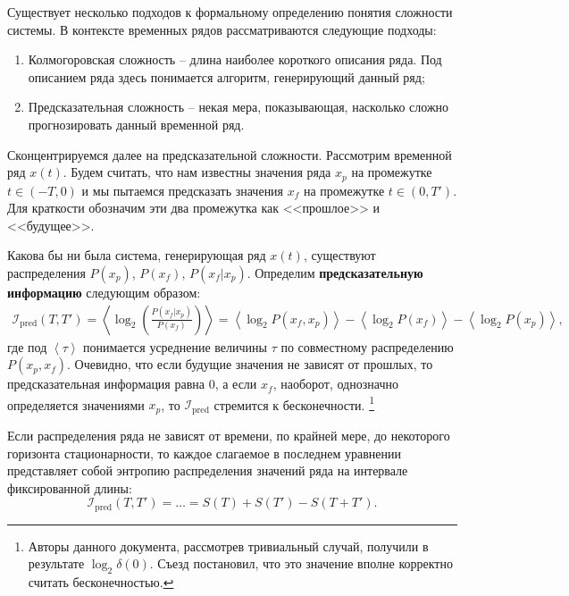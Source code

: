 
Существует несколько подходов к формальному определению понятия сложности системы.
В контексте временных рядов рассматриваются следующие подходы:
\begin{enumerate}
\item
    Колмогоровская сложность -- длина наиболее короткого описания ряда. Под описанием ряда здесь понимается алгоритм, генерирующий данный ряд;
\item
    Предсказательная сложность -- некая мера, показывающая, насколько сложно прогнозировать данный временной ряд.
\end{enumerate}

Сконцентрируемся далее на предсказательной сложности.
Рассмотрим временной ряд $x(t)$.
Будем считать, что нам известны значения ряда $x_p$ на промежутке $t \in \left( -T, 0 \right)$ и мы пытаемся предсказать значения $x_f$ на промежутке $t \in \left( 0, T' \right)$.
Для краткости обозначим эти два промежутка как <<прошлое>> и <<будущее>>.

Какова бы ни была система, генерирующая ряд $x(t)$, существуют распределения $P(x_p)$, $P(x_f)$, $P(x_f | x_p)$.
Определим \textbf{предсказательную информацию} следующим образом:
\begin{gather*}
    \mathcal{I}_{\text{pred}}\left( T, T' \right) =
    \left\langle \log_2 \left( \frac{P(x_f | x_p)}{P(x_f)} \right) \right\rangle =
    \left\langle \log_2 P(x_f, x_p) \right\rangle - \left\langle \log_2 P(x_f) \right\rangle - \left\langle \log_2 P(x_p) \right\rangle,
\end{gather*}
где под $\left\langle\tau\right\rangle$ понимается усреднение величины $\tau$ по совместному распределению $P(x_p, x_f)$.
Очевидно, что если будущие значения не зависят от прошлых, то предсказательная информация равна $0$, а если $x_f$, наоборот, однозначно определяется значениями $x_p$, то $\mathcal{I}_{\text{pred}}$ стремится к бесконечности.
\footnote{Авторы данного документа, рассмотрев тривиальный случай, получили в результате $\log_2 \delta(0)$. Съезд постановил, что это значение вполне корректно считать бесконечностью.}

Если распределения ряда не зависят от времени, по крайней мере, до некоторого горизонта стационарности, то каждое слагаемое в последнем уравнении представляет собой энтропию распределения значений ряда на интервале фиксированной длины:
\begin{equation}
\label{10_1}
    \mathcal{I}_{\text{pred}}\left( T, T' \right) =
    \dots =
    S(T) + S(T') - S(T + T').
\end{equation}


